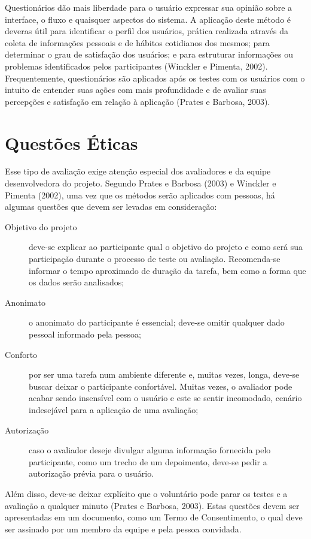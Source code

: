 Questionários dão mais liberdade para o usuário expressar sua opinião sobre a interface, o fluxo e quaisquer aspectos do sistema. A aplicação deste método é deveras útil para identificar o perfil dos usuários, prática realizada através da coleta de informações pessoais e de hábitos cotidianos dos mesmos; para determinar o grau de satisfação dos usuários; e para estruturar informações ou problemas identificados pelos participantes (Winckler e Pimenta, 2002). Frequentemente, questionários são aplicados após os testes com os usuários com o intuito de entender suas ações com mais profundidade e de avaliar suas percepções e satisfação em relação à aplicação (Prates e Barbosa, 2003).

\section{Questões Éticas}

Esse tipo de avaliação exige atenção especial dos avaliadores e da equipe desenvolvedora do projeto. Segundo Prates e Barbosa (2003) e Winckler e Pimenta (2002), uma vez que os métodos serão aplicados com pessoas, há algumas questões que devem ser levadas em consideração:
    \begin{description}
        \item [Objetivo do projeto] deve-se explicar ao participante qual o objetivo do projeto e como será sua participação durante o processo de teste ou avaliação. Recomenda-se informar o tempo aproximado de duração da tarefa, bem como a forma que os dados serão analisados;
        \item [Anonimato] o anonimato do participante é essencial; deve-se omitir qualquer dado pessoal informado pela pessoa;
        \item [Conforto] por ser uma tarefa num ambiente diferente e, muitas vezes, longa, deve-se buscar deixar o participante confortável. Muitas vezes, o avaliador pode acabar sendo insensível com o usuário e este se sentir incomodado, cenário indesejável para a aplicação de uma avaliação;
        \item [Autorização] caso o avaliador deseje divulgar alguma informação fornecida pelo participante, como um trecho de um depoimento, deve-se pedir a autorização prévia para o usuário.
    \end{description}
Além disso, deve-se deixar explícito que o voluntário pode parar os testes e a avaliação a qualquer minuto (Prates e Barbosa, 2003). Estas questões devem ser apresentadas em um documento, como um Termo de Consentimento, o qual deve ser assinado por um membro da equipe e pela pessoa convidada.